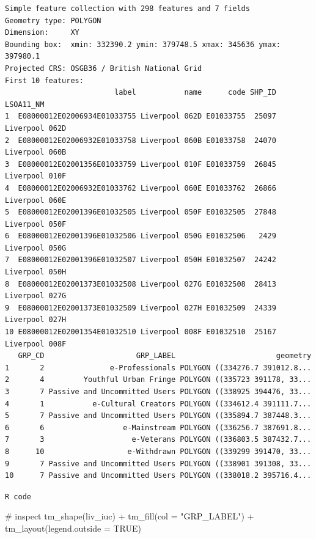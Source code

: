 \documentclass[
  letterpaper,
  DIV=11,
  numbers=noendperiod]{scrreprt}
\newenvironment{Shaded}{\begin{snugshade}}{\end{snugshade}}
\newcommand{\AttributeTok}[1]{\textcolor[rgb]{0.40,0.45,0.13}{#1}}
\newcommand{\CommentTok}[1]{\textcolor[rgb]{0.37,0.37,0.37}{#1}}
\newcommand{\ConstantTok}[1]{\textcolor[rgb]{0.56,0.35,0.01}{#1}}
\newcommand{\FunctionTok}[1]{\textcolor[rgb]{0.28,0.35,0.67}{#1}}
\newcommand{\NormalTok}[1]{\textcolor[rgb]{0.00,0.23,0.31}{#1}}
\newcommand{\SpecialCharTok}[1]{\textcolor[rgb]{0.37,0.37,0.37}{#1}}
\newcommand{\StringTok}[1]{\textcolor[rgb]{0.13,0.47,0.30}{#1}}
\begin{document}
\begin{verbatim}
Simple feature collection with 298 features and 7 fields
Geometry type: POLYGON
Dimension:     XY
Bounding box:  xmin: 332390.2 ymin: 379748.5 xmax: 345636 ymax: 397980.1
Projected CRS: OSGB36 / British National Grid
First 10 features:
                         label           name      code SHP_ID      LSOA11_NM
1  E08000012E02006934E01033755 Liverpool 062D E01033755  25097 Liverpool 062D
2  E08000012E02006932E01033758 Liverpool 060B E01033758  24070 Liverpool 060B
3  E08000012E02001356E01033759 Liverpool 010F E01033759  26845 Liverpool 010F
4  E08000012E02006932E01033762 Liverpool 060E E01033762  26866 Liverpool 060E
5  E08000012E02001396E01032505 Liverpool 050F E01032505  27848 Liverpool 050F
6  E08000012E02001396E01032506 Liverpool 050G E01032506   2429 Liverpool 050G
7  E08000012E02001396E01032507 Liverpool 050H E01032507  24242 Liverpool 050H
8  E08000012E02001373E01032508 Liverpool 027G E01032508  28413 Liverpool 027G
9  E08000012E02001373E01032509 Liverpool 027H E01032509  24339 Liverpool 027H
10 E08000012E02001354E01032510 Liverpool 008F E01032510  25167 Liverpool 008F
   GRP_CD                     GRP_LABEL                       geometry
1       2               e-Professionals POLYGON ((334276.7 391012.8...
2       4         Youthful Urban Fringe POLYGON ((335723 391178, 33...
3       7 Passive and Uncommitted Users POLYGON ((338925 394476, 33...
4       1           e-Cultural Creators POLYGON ((334612.4 391111.7...
5       7 Passive and Uncommitted Users POLYGON ((335894.7 387448.3...
6       6                  e-Mainstream POLYGON ((336256.7 387691.8...
7       3                    e-Veterans POLYGON ((336803.5 387432.7...
8      10                   e-Withdrawn POLYGON ((339299 391470, 33...
9       7 Passive and Uncommitted Users POLYGON ((338901 391308, 33...
10      7 Passive and Uncommitted Users POLYGON ((338018.2 395716.4...
\end{verbatim}

\begin{codelisting}

\caption{\texttt{R code}}

\begin{Shaded}
\begin{Highlighting}[]
\CommentTok{\# inspect}
\FunctionTok{tm\_shape}\NormalTok{(liv\_iuc) }\SpecialCharTok{+} \FunctionTok{tm\_fill}\NormalTok{(}\AttributeTok{col =} \StringTok{"GRP\_LABEL"}\NormalTok{) }\SpecialCharTok{+} \FunctionTok{tm\_layout}\NormalTok{(}\AttributeTok{legend.outside =} \ConstantTok{TRUE}\NormalTok{)}
\end{Highlighting}
\end{Shaded}

\end{codelisting}
\end{document}
